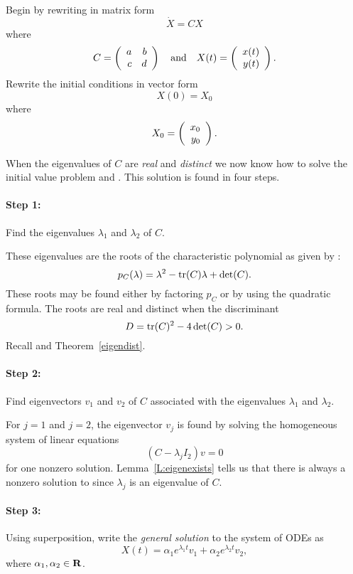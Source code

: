 Begin by rewriting  in matrix form
\begin{equation}  \label{E:2dodeM}
\dot{X} = CX
\end{equation}
where
\[
C = \left(\begin{array}{rr} a & b\\ c &d\end{array}\right) \quad\mbox{and}\quad X(t)=\left(\begin{array}{r} x(t) \\ y(t)\end{array}\right).
\]
Rewrite the initial conditions  in vector form
\begin{equation}  \label{E:2dicV}
X(0) = X_0
\end{equation}
where
\[
X_0=\left(\begin{array}{r} x_0 \\ y_0\end{array}\right).
\]

When the eigenvalues of $C$ are {\em real\/} and {\em distinct\/} we now
know how to solve the initial value problem  and .
This solution is found in four steps.

\paragraph{Step 1:}  Find the eigenvalues $\lambda_1$ and $\lambda_2$ of $C$.

These eigenvalues are the roots of the characteristic
polynomial as given by :
\[
p_C(\lambda)=\lambda^2-{\rm tr}(C)\lambda+\det(C).
\]
These roots may be found either by factoring $p_C$ or by using the quadratic
formula.  The roots are real and distinct when the discriminant
\[
D={\rm tr}(C)^2-4\det(C)>0.
\]
Recall  and Theorem~\ref{eigendist}.

\paragraph{Step 2:}  Find eigenvectors $v_1$ and $v_2$ of $C$ associated
with the eigenvalues $\lambda_1$ and $\lambda_2$.

For $j=1$ and $j=2$, the eigenvector $v_j$ is found by solving the
homogeneous system of linear equations
\begin{equation}  \label{E:eeqn}
(C-\lambda_j I_2)v = 0
\end{equation}
for one nonzero solution.  Lemma~\ref{L:eigenexists} tells us that there is
always a nonzero solution to  since $\lambda_j$ is an eigenvalue
of $C$.

\paragraph{Step 3:}  Using superposition, write the {\em general solution\/}
 to the system of ODEs  as
\begin{equation}  \label{E:gensoln}
X(t) = \alpha_1e^{\lambda_1 t}v_1 + \alpha_2 e^{\lambda_2 t}v_2,
\end{equation}
where $\alpha_1,\alpha_2\in\mbox{$\bf{R}$}$.

